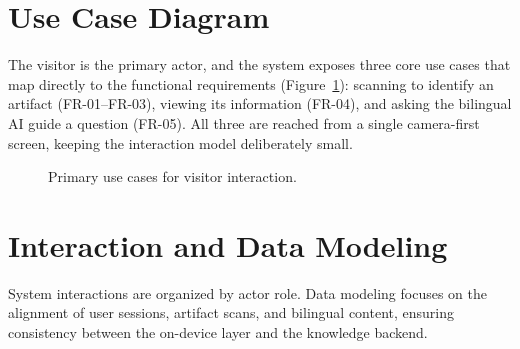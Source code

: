 \section{Use Case Diagram}

The visitor is the primary actor, and the system exposes three core use cases that map
directly to the functional requirements (Figure~\ref{fig:usecase}): scanning to
identify an artifact (FR-01--FR-03), viewing its information (FR-04), and asking the
bilingual AI guide a question (FR-05). All three are reached from a single camera-first
screen, keeping the interaction model deliberately small.

\begin{figure}[htbp]
\centering
{}
\caption{Primary use cases for visitor interaction.}
\label{fig:usecase}
\end{figure}

\FloatBarrier

\section{Interaction and Data Modeling}

System interactions are organized by actor role. Data modeling focuses on the
alignment of user sessions, artifact scans, and bilingual content, ensuring
consistency between the on-device layer and the knowledge backend.

